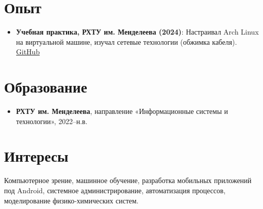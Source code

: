 \documentclass[a4paper,11pt]{article}
\begin{document}
	\section{Опыт}
	\begin{itemize}[leftmargin=*]
		\item \textbf{Учебная практика, РХТУ им. Менделеева (2024)}: Настраивал Arch Linux на виртуальной машине, изучал сетевые технологии (обжимка кабеля). \href{https://github.com/CorgiPuppy/intro-edu-practice}{GitHub}
	\end{itemize}

	\section{Образование}
	\begin{itemize}[leftmargin=*]
		\item \textbf{РХТУ им. Менделеева}, направление «Информационные системы и технологии», 2022–н.в.
	\end{itemize}

	\section{Интересы}
	Компьютерное зрение, машинное обучение, разработка мобильных приложений под Android, системное администрирование, автоматизация процессов, моделирование физико-химических систем.
\end{document}
